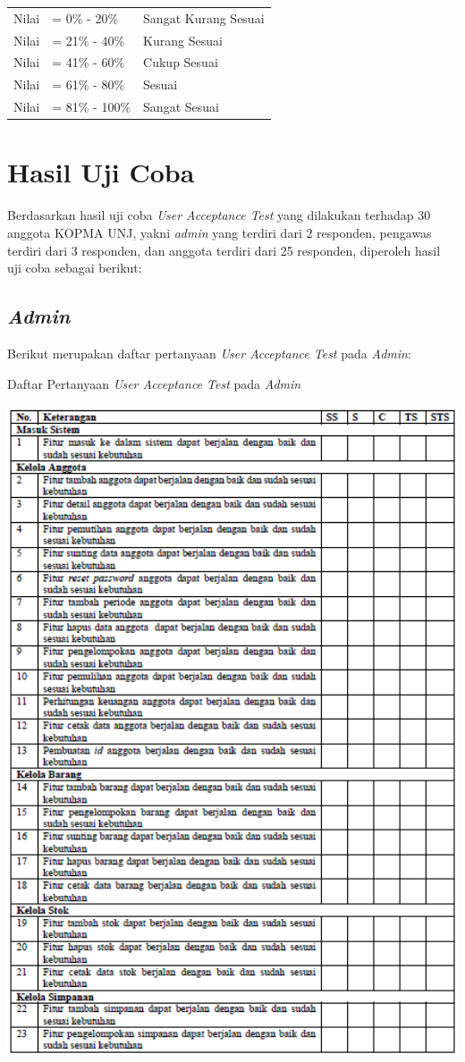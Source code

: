 \begin{tabular}{lll}
	Nilai& = 0\% - 20\%& Sangat Kurang Sesuai \\
	Nilai& = 21\% - 40\%& Kurang Sesuai\\
	Nilai& = 41\% - 60\%& Cukup Sesuai\\
	Nilai& = 61\% - 80\%& Sesuai\\
	Nilai& = 81\% - 100\%& Sangat Sesuai\\
\end{tabular}

\section{Hasil Uji Coba}
Berdasarkan hasil uji coba \textit{User Acceptance Test} yang dilakukan terhadap 30 anggota KOPMA UNJ, yakni \textit{admin} yang terdiri dari 2 responden, pengawas terdiri dari 3 responden, dan anggota terdiri dari 25 responden, diperoleh hasil uji coba sebagai berikut:

\subsection{\textit{Admin}}
Berikut merupakan daftar pertanyaan \textit{User Acceptance Test} pada \textit{Admin}:

\begin{table}[H]
	\centering
	\caption{Daftar Pertanyaan \textit{User Acceptance Test} pada \textit{Admin}}
	\includegraphics[width=1.0\textwidth]{gambar/Tabel_Admin1}
\end{table}

